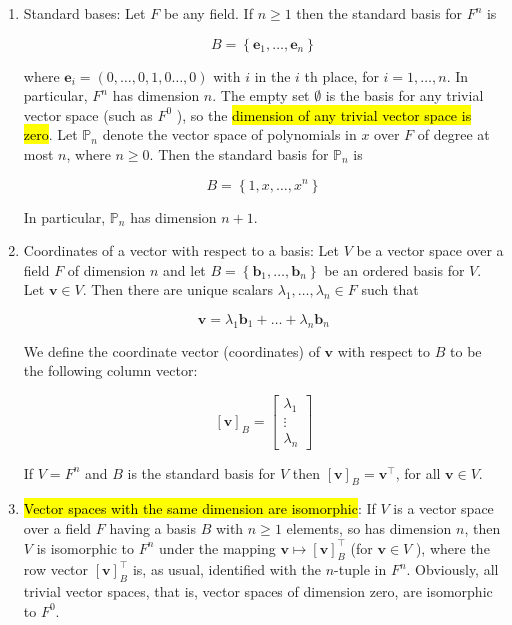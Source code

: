 \documentclass{article}
\begin{document}
\begin{enumerate}
        \item Standard bases: Let $F$ be any field. If $n \geq 1$ then the standard basis for $F^{n}$ is

        $$
        B=\left\{\mathbf{e}_{1}, \ldots, \mathbf{e}_{n}\right\}
        $$

        where $\mathbf{e}_{i}=(0, \ldots, 0,1,0 \ldots, 0)$ with $i$ in the $i$ th place, for $i=1, \ldots, n$. In particular, $F^{n}$ has dimension $n$. The empty set $\emptyset$ is the basis for any trivial vector space (such as $F^{0}$ ), so the \hl{dimension of any trivial vector space is zero}. Let $\mathbb{P}_{n}$ denote the vector space of polynomials in $x$ over $F$ of degree at most $n$, where $n \geq 0$. Then the standard basis for $\mathbb{P}_{n}$ is

        $$
        B=\left\{1, x, \ldots, x^{n}\right\}
        $$

        In particular, $\mathbb{P}_{n}$ has dimension $n+1$.\\
        
        \item Coordinates of a vector with respect to a basis: Let $V$ be a vector space over a field $F$ of dimension $n$ and let $B=\left\{\mathbf{b}_{1}, \ldots, \mathbf{b}_{n}\right\}$ be an ordered basis for $V$. Let $\mathbf{v} \in V$. Then there are unique scalars $\lambda_{1}, \ldots, \lambda_{n} \in F$ such that

        $$
        \mathbf{v}=\lambda_{1} \mathbf{b}_{1}+\ldots+\lambda_{n} \mathbf{b}_{n}
        $$

        We define the coordinate vector (coordinates) of $\mathbf{v}$ with respect to $B$ to be the following column vector:

        $$
        [\mathbf{v}]_{B}=\left[\begin{array}{c}
        \lambda_{1} \\
        \vdots \\
        \lambda_{n}
        \end{array}\right]
        $$

        If $V=F^{n}$ and $B$ is the standard basis for $V$ then $[\mathbf{v}]_{B}=\mathbf{v}^{\top}$, for all $\mathbf{v} \in V$.

        \item \hl{Vector spaces with the same dimension are isomorphic}: If $V$ is a vector space over a field $F$ having a basis $B$ with $n \geq 1$ elements, so has dimension $n$, then $V$ is isomorphic to $F^{n}$ under the mapping $\mathbf{v} \mapsto[\mathbf{v}]_{B}^{\top}$ (for $\mathbf{v} \in V$ ), where the row vector $[\mathbf{v}]_{B}^{\top}$ is, as usual, identified with the $n$-tuple in $F^{n}$. Obviously, all trivial vector spaces, that is, vector spaces of dimension zero, are isomorphic to $F^{0}$.


\end{enumerate}
\end{document}
